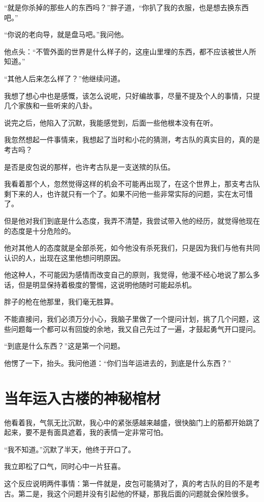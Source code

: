 “就是你杀掉的那些人的东西吗？”胖子道，“你扒了我的衣服，也是想去换东西吧。”

“你说的老向导，就是盘马吧。”我问他。

他点头：“不管外面的世界是什么样子的，这座山里埋的东西，都不应该被世人所知道。”

“其他人后来怎么样了？”他继续问道。

我想了想心中也是感慨，该怎么说呢，只好编故事，尽量不提及个人的事情，只提几个家族和一些听来的八卦。

说完之后，他陷入了沉默，我能感觉到，后面一些他根本没有在听。

我忽然想起一件事情来，我想起了当时和小花的猜测，考古队的真实目的，真的是考古吗？

是否是皮包说的那样，也许考古队是一支送殡的队伍。

我看着那个人，忽然觉得这样的机会不可能再出现了，在这个世界上，那支考古队剩下来的人，也许就只有一个了。如果不问他一些非常实际的问题，实在太可惜了。

但是他对我们到底是什么态度，我弄不清楚，我尝试带入他的经历，就觉得他现在的态度是十分危险的。

他对其他人的态度就是全部杀死，如今他没有杀死我们，只是因为我们与他有共同认识的人，出现在这里他想问明原因。

他这种人，不可能因为感情而改变自己的原则，我觉得，他漫不经心地说了那么多话，但是明显保持着极度的警惕，这说明他随时可能起杀机。

胖子的枪在他那里，我们毫无胜算。

不能直接问，我们必须万分小心，我脑子里做了一个提问计划，挑了几个问题，这些问题每一个都可以有回旋的余地，我又自己先过了一遍，才鼓起勇气开口提问。

“到底是什么东西？”这是第一个问题。

他愣了一下，抬头。我问他道：“你们当年运进去的，到底是什么东西？”

\chapter{当年运入古楼的神秘棺材}

他看着我，气氛无比沉默，我心中的紧张感越来越盛，很快脑门上的筋都开始跳了起来，要不是有面具遮着，我的表情一定非常可怕。

“我不知道。”沉默了半天，他终于开口了。

我立即松了口气，同时心中一片狂喜。

这个反应说明两件事情：第一件就是，皮包可能猜对了，真的考古队的目的不是考古。第二是，我这个问题并没有引起他的怀疑，那我后面的问题就会保险很多。

